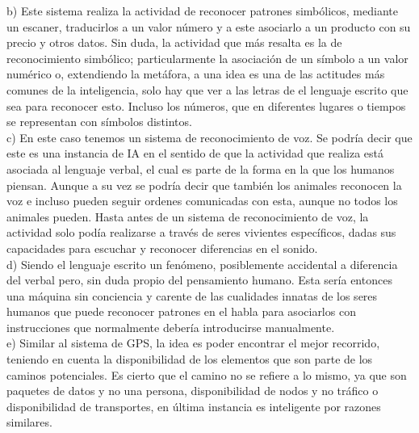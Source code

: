 b) Este sistema realiza la actividad de reconocer patrones simbólicos, mediante un escaner, traducirlos a un valor número y a este asociarlo a un producto con su precio y otros datos. Sin duda, la actividad que más resalta es la de reconocimiento simbólico; particularmente la asociación de un símbolo a un valor numérico o, extendiendo la metáfora, a una idea es una de las actitudes más comunes de la inteligencia, solo hay que ver a las letras de el lenguaje escrito que sea para reconocer esto. Incluso los números, que en diferentes lugares o tiempos se representan con símbolos distintos. \\

c) En este caso tenemos un sistema de reconocimiento de voz. Se podría decir que este es una instancia de IA en el sentido de que la actividad que realiza está asociada al lenguaje verbal, el cual es parte de la forma en la que los humanos piensan. Aunque a su vez se podría decir que también los animales reconocen la voz e incluso pueden seguir ordenes comunicadas con esta, aunque no todos los animales pueden. Hasta antes de un sistema de reconocimiento de voz, la actividad solo podía realizarse a través de seres vivientes específicos, dadas sus capacidades para escuchar y reconocer diferencias en el sonido. \\

d) Siendo el lenguaje escrito un fenómeno, posiblemente accidental a diferencia del verbal pero, sin duda propio del pensamiento humano. Esta sería entonces una máquina sin conciencia y carente de las cualidades innatas de los seres humanos que puede reconocer patrones en el habla para asociarlos con instrucciones que normalmente debería introducirse manualmente. \\

e) Similar al sistema de GPS, la idea es poder encontrar el mejor recorrido, teniendo en cuenta la disponibilidad de los elementos que son parte de los caminos potenciales. Es cierto que el camino no se refiere a lo mismo, ya que son paquetes de datos y no una persona, disponibilidad de nodos y no tráfico o disponibilidad de transportes, en última instancia es inteligente por razones similares.

\bigskip